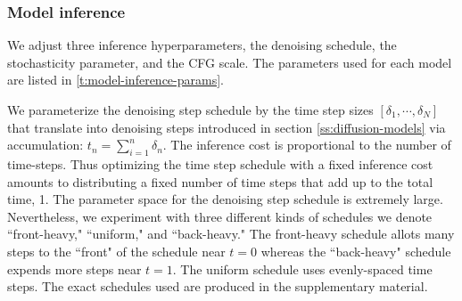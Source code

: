 \documentclass[nohyperref]{article}
\theoremstyle{plain}
\theoremstyle{definition}
\theoremstyle{remark}
\begin{document}
\subsubsection{Model inference}


\begin{table}
\caption{Inference parameters for the models used in this work.}
\vskip 0.05in
  \label{t:model-inference-params}
  \centering
\vskip-0.2in
\end{table}

We adjust three inference hyperparameters, the denoising schedule, the stochasticity parameter, and the CFG scale. The parameters used for each model are listed in \cref{t:model-inference-params}.

We parameterize the denoising step schedule by the time step sizes $[\delta_1, \cdots, \delta_N]$ that translate into denoising steps introduced in section \ref{ss:diffusion-models} via accumulation: $t_n = \sum_{i=1}^n \delta_n$. The inference cost is proportional to the number of time-steps. Thus optimizing the time step schedule with a fixed inference cost amounts to distributing a fixed number of time steps that add up to the total time, 1. The parameter space for the denoising step schedule is extremely large. Nevertheless, we experiment with three different kinds of schedules we denote ``front-heavy," ``uniform," and ``back-heavy." The front-heavy schedule allots many steps to the ``front" of the schedule near $t=0$ whereas the ``back-heavy" schedule expends more steps near $t=1$. The uniform schedule uses evenly-spaced time steps. The exact schedules used are produced in the supplementary material.
\end{document}
